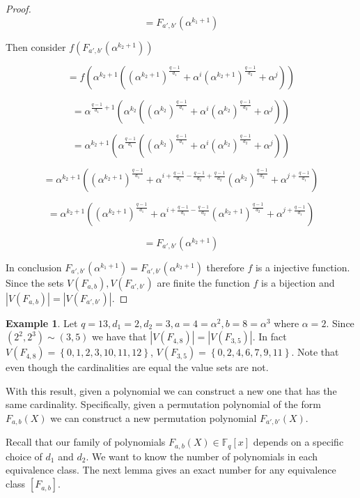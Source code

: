 \documentclass{article}
\theoremstyle{definition}
\newtheorem{example}[theorem]{Example}
\theoremstyle{remark}
\numberwithin{equation}{section}
\begin{document}
\begin{proof}
  $$= F_{a', b'}(\alpha^{k_1+1})$$

  Then consider $f(F_{a', b'}(\alpha^{k_2+1}))$

  $$= f(\alpha^{k_2+1}((\alpha^{k_2+1})^{\frac{q-1}{d_1}} + \alpha^{i}(\alpha^{k_2+1})^{\frac{q-1}{d_2}} + \alpha^{j}))$$

  $$ = \alpha^{\frac{q-1}{d_1}+1}(\alpha^{k_2}((\alpha^{k_2})^{\frac{q-1}{d_1}} + \alpha^{i}(\alpha^{k_2})^{\frac{q-1}{d_2}} + \alpha^{j}))$$

  $$ = \alpha^{k_2+1}(\alpha^{\frac{q-1}{d_1}}((\alpha^{k_2})^{\frac{q-1}{d_1}} + \alpha^{i}(\alpha^{k_2})^{\frac{q-1}{d_2}} + \alpha^{j}))$$

  $$ = \alpha^{k_2+1}((\alpha^{k_2 + 1})^{\frac{q-1}{d_1}} + \alpha^{i + \frac{q-1}{d_1} - \frac{q-1}{d_2} + \frac{q-1}{d_2}}(\alpha^{k_2})^{\frac{q-1}{d_2}} + \alpha^{j + \frac{q-1}{d_1}})$$

  $$= \alpha^{k_2+1}((\alpha^{k_2 + 1})^{\frac{q-1}{d_1}} + \alpha^{i + \frac{q-1}{d_1} - \frac{q-1}{d_2}}(\alpha^{k_2 + 1})^{\frac{q-1}{d_2}} + \alpha^{j + \frac{q-1}{d_1}})$$

  $$= F_{a', b'}(\alpha^{k_2+1})$$

  In conclusion $F_{a', b'}(\alpha^{k_1+1}) = F_{a', b'}(\alpha^{k_2+1})$ therefore $f$ is a injective function. Since the sets $V(F_{a,b}), V(F_{a',b'})$ are finite the function $f$ is a bijection and $|V(F_{a,b})| = |V(F_{a',b'})|$.

\end{proof}

 \begin{example}
    Let $q = 13, d_1 = 2, d_2 = 3, a = 4 = \alpha^2, b = 8 = \alpha^3 $ where $\alpha = 2$. Since $(2^2,2^3) \sim (3,5)$ we have that $|V(F_{4, 8})| = |V(F_{3, 5})|$. In fact $V(F_{4, 8}) = \left\{0, 1, 2, 3, 10, 11, 12\right\}$, $V(F_{3, 5}) = \left\{0, 2, 4, 6, 7, 9, 11\right\}$. Note that even though the cardinalities are equal the value sets are not.
  \end{example}

With this result, given a polynomial we can construct a new one that has the same cardinality. Specifically, given a permutation polynomial of the form $F_{a,b}(X)$ we can construct a new permutation polynomial $F_{a',b'}(X)$.

Recall that our family of polynomials $F_{a,b}(X) \in \mathbb{F}_{q}[x]$ depends on a specific choice of $d_1$ and $d_2$. We want to know the number of polynomials in each equivalence class. The next lemma gives an exact number for any equivalence class $[F_{a,b}]$.
\end{document}
